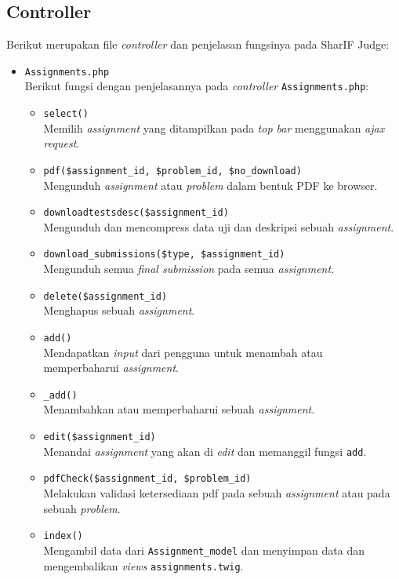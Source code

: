 \begin{itemize}
\subsection{Controller}

Berikut merupakan file \textit{controller} dan penjelasan fungsinya pada SharIF Judge:
\begin{itemize}
	\item \verb|Assignments.php| \\
	      Berikut fungsi dengan penjelasannya pada \textit{controller} \verb|Assignments.php|:

	      \begin{itemize}
		      \item \verb|select()| \\
		            Memilih \textit{assignment} yang ditampilkan pada \textit{top bar} menggunakan \textit{ajax request}.
		      \item \verb|pdf($assignment_id, $problem_id, $no_download)| \\
		            Mengunduh \textit{assignment} atau \textit{problem} dalam bentuk PDF ke browser.
		      \item \verb|downloadtestsdesc($assignment_id)| \\
		            Mengunduh dan mencompress data uji dan deskripsi sebuah \textit{assignment}.
		      \item \verb|download_submissions($type, $assignment_id)| \\
		            Mengunduh semua \textit{final submission} pada semua \textit{assignment}.
		      \item \verb|delete($assignment_id)| \\
		            Menghapus sebuah \textit{assignment}.
		      \item \verb|add()| \\
		            Mendapatkan \textit{input} dari pengguna untuk menambah atau memperbaharui \textit{assignment}.
		      \item \verb|_add()| \\
		            Menambahkan atau memperbaharui sebuah \textit{assignment}.
		      \item \verb|edit($assignment_id)| \\
		            Menandai \textit{assignment} yang akan di \textit{edit} dan memanggil fungsi \verb|add|.
		      \item \verb|pdfCheck($assignment_id, $problem_id)| \\
		            Melakukan validasi ketersediaan pdf pada sebuah \textit{assignment} atau pada sebuah \textit{problem}.
		      \item \verb|index()| \\
		            Mengambil data dari \verb|Assignment_model| dan menyimpan data dan mengembalikan \textit{views} \verb|assignments.twig|. 
	      \end{itemize}


\end{itemize}
\end{itemize}
